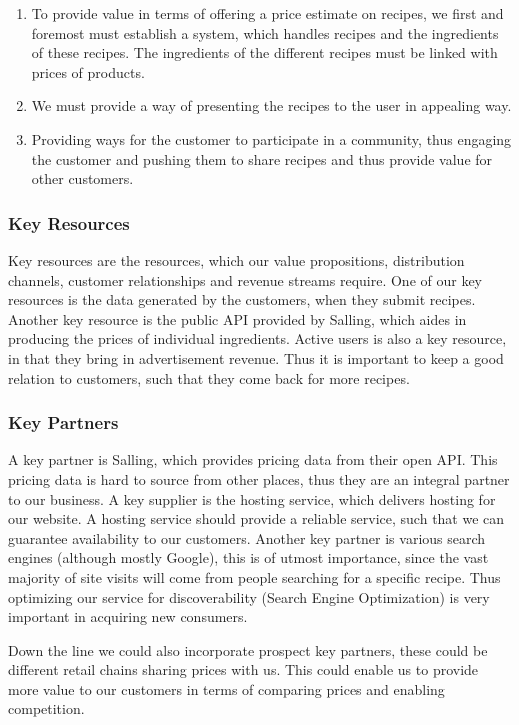 \documentclass{article}
\begin{document}
\begin{enumerate}
  \item To provide value in terms of offering a price estimate on recipes, we first and
    foremost must establish a system, which handles recipes and the ingredients of these
    recipes. The ingredients of the different recipes must be linked with prices of
    products.
  \item We must provide a way of presenting the recipes to the user in appealing way.
  \item Providing ways for the customer to participate in a community, thus engaging the
    customer and pushing them to share recipes and thus provide value for other customers. 
\end{enumerate}

\subsubsection{Key Resources}
Key resources are the resources, which our value propositions, distribution channels,  
customer relationships and revenue streams require. One of our key resources is the data
generated by the customers, when they submit recipes. Another key resource is the public
API provided by Salling, which aides in producing the prices of individual ingredients.
Active users is also a key resource, in that they bring in advertisement revenue. Thus it
is important to keep a good relation to customers, such that they come back for more
recipes.

\subsubsection{Key Partners}
A key partner is Salling, which provides pricing data from their open API. This pricing
data is hard to source from other places, thus they are an integral partner to our
business. A key supplier
is the hosting service, which delivers hosting for our website. A hosting service should
provide a reliable service, such that we can guarantee availability to our customers.
Another key partner is various search engines (although mostly Google), this is of utmost
importance, since the vast majority of site visits will come from people searching for a
specific recipe. Thus optimizing our service for discoverability (Search Engine
Optimization) is very important in acquiring new consumers.

Down the line we could also incorporate prospect key partners, these could be different
retail chains sharing prices with us. This could enable us to provide more value to our
customers in terms of comparing prices and enabling competition.
\end{document}
